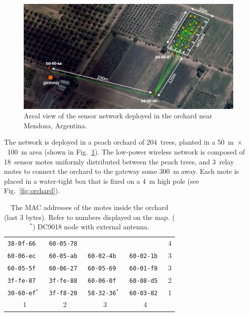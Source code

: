\documentclass{sig-alternate}
\begin{document}
\begin{figure}
    \centering
    \includegraphics[width=\textwidth]{map_annotated}
    \caption{Areal view of the sensor network deployed in the orchard near Mendoza, Argentina.}
    \label{fig:map}
\end{figure}


The network is deployed in a peach orchard of 204~trees, planted in a 50~m~$\times$~100~m area (shown in Fig.~\ref{fig:map}).
The low-power wireless network is composed of 18~sensor motes uniformly distributed between the peach trees, and 3~relay motes to connect the orchard to the gateway some 300~m away.
Each mote is placed in a water-tight box that is fixed on a 4~m high pole (see Fig.~\ref{fig:orchard}).

\begin{table}
\begin{center}
    \begin{tabular}{ | l | l | l | l | l |}
         \hline
         \tt{38-0f-66}     & \tt{60-05-78} &                   &               & 4 \\
         \tt{60-06-ec}     & \tt{60-05-ab} & \tt{60-02-4b}     & \tt{60-02-1b} & 3 \\
         \tt{60-05-5f}     & \tt{60-06-27} & \tt{60-05-69}     & \tt{60-01-f8} & 3 \\
         \tt{3f-fe-87}     & \tt{3f-fe-88} & \tt{60-06-0f}     & \tt{60-08-d5} & 2 \\
         \tt{30-60-ef}$^*$ & \tt{3f-f8-20} & \tt{58-32-36}$^*$ & \tt{60-03-82} & 1 \\
         \hline
           \multicolumn{1}{|c|}{1} & \multicolumn{1}{|c|}{2} & \multicolumn{1}{|c|}{3} & \multicolumn{1}{|c|}{4} &\\
         \hline
    \end{tabular}
    \caption{The MAC addresses of the motes inside the orchard (last 3 bytes). Refer to numbers displayed on the map. ($^*$) DC9018 node with external antenna.}
\end{center}
\end{table}
\end{document}
